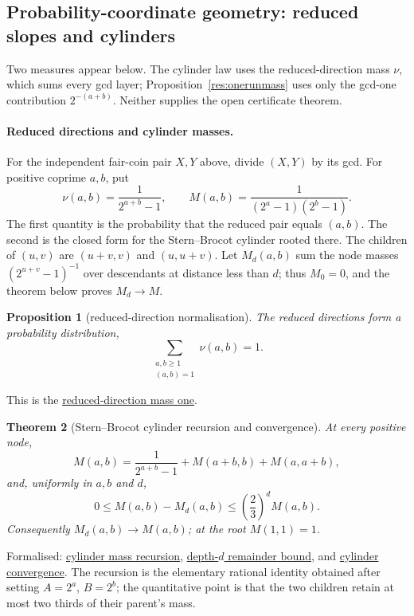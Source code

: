 \documentclass[11pt]{article}
\newcommand{\commit}{99f4bf47422abbd8757cbb22b50ba079d764d3a7}
\newcommand{\repobase}{https://github.com/wcook04/plectis-erdos/blob/\commit}
\newcommand{\PK}{Erdos249257}
\newcommand{\lword}[4]{\href{\repobase/\PK/#1\#L#2}{#4}}
\newtheorem{theorem}{Theorem}[section]
\newtheorem{proposition}[theorem]{Proposition}
\theoremstyle{definition}
\theoremstyle{remark}
\begin{document}
{\subsection{Probability-coordinate geometry: reduced slopes and cylinders}
\label{app:lambert-probability}

Two measures appear below.  The cylinder law uses the reduced-direction mass
$\nu$, which sums every gcd layer; Proposition~\ref{res:onerunmass} uses only
the gcd-one contribution $2^{-(a+b)}$.  Neither supplies the open certificate
theorem.

\paragraph{Reduced directions and cylinder masses.}
For the independent fair-coin pair $X,Y$ above, divide $(X,Y)$ by its gcd.
For positive coprime \(a,b\), put
\[
  \nu(a,b)=\frac1{2^{a+b}-1},
  \qquad
  M(a,b)=\frac1{(2^a-1)(2^b-1)}.
\]
The first quantity is the probability that the reduced pair equals $(a,b)$.
The second is the closed form for the Stern--Brocot cylinder rooted there.
The children of $(u,v)$ are $(u+v,v)$ and $(u,u+v)$.  Let $M_d(a,b)$ sum the
node masses $(2^{u+v}-1)^{-1}$ over descendants at distance less than $d$;
thus $M_0=0$, and the theorem below proves $M_d\to M$.

\begin{proposition}[reduced-direction normalisation]\label{res:directionnormalization}
The reduced directions form a probability distribution,
\[
  \sum_{\substack{a,b\ge1\\(a,b)=1}}\nu(a,b)=1.
\]
\end{proposition}
\noindent This is the
\lword{GcdMomentCalculus.lean}{349}{tsum_pos_coprime_inv_mersenne_eq_one}{reduced-direction mass one}.

\begin{theorem}[Stern--Brocot cylinder recursion and convergence]
\label{res:sternbrocotcylinders}
At every positive node,
\[
  M(a,b)=\frac1{2^{a+b}-1}+M(a+b,b)+M(a,a+b),
\]
and, uniformly in \(a,b\) and \(d\),
\[
  0\le M(a,b)-M_d(a,b)
  \le \left(\frac23\right)^d M(a,b).
\]
Consequently \(M_d(a,b)\to M(a,b)\); at the root \(M(1,1)=1\).
\end{theorem}
\noindent Formalised:
\lword{GcdMomentCalculus.lean}{474}{cylinderMass_split}{cylinder mass recursion},
\lword{GcdMomentCalculus.lean}{525}{sternBrocotDepthMass_error}{depth-$d$ remainder bound}, and
\lword{GcdMomentCalculus.lean}{560}{tendsto_sternBrocotDepthMass}{cylinder convergence}.
The recursion is the elementary rational identity obtained after setting
\(A=2^a\), \(B=2^b\); the quantitative point is that the two children retain
at most two thirds of their parent's mass.

}
\end{document}
